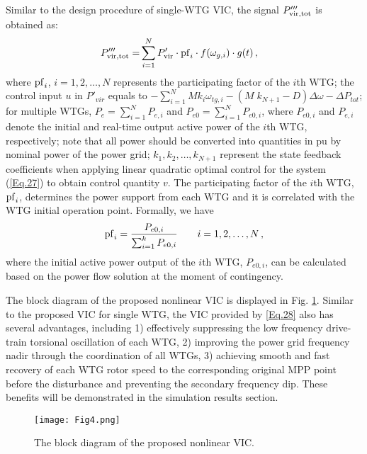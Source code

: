 \documentclass[journal]{IEEEtran}
\begin{document}
Similar to the design procedure of single-WTG VIC, the signal $P'''_{\rm vir, tot}$ is obtained as:
%
\begin{equation}
  \label{Eq.28}
  \begin{aligned}
    P'''_{\rm vir, tot} =& \sum_{i=1}^N P'_{{\rm vir}} \cdot {\rm pf}_i \cdot f(\omega_{g,i})\cdot g(t) \, ,
  \end{aligned} 
\end{equation}
where ${\rm pf}_i$, $i=1,2,\dots,N$ represents the participating factor of the $i$th WTG; the control input $u$ in $P'_{vir}$ equals to $-\sum_{i=1}^N {M{k_i}\omega_{tg,i}-(M\;k_{N+1}-D)\Delta \omega -\Delta P_{tot}}$; for multiple WTGs, $P_e=\sum_{i=1}^N P_{e,i}$ and $P_{e0}=\sum_{i=1}^N P_{{e0},i}$, where $P_{{e0},i}$ and $P_{e,i}$ denote the initial and real-time output active power of the $i$th WTG, respectively; note that all power should be converted into quantities in pu by nominal power of the power grid; $k_1,k_2, \dots,k_{N+1}$ represent the state feedback coefficients when applying linear quadratic optimal control for the system (\ref{Eq.27}) to obtain control quantity $v$. The participating factor of the $i$th WTG, ${\rm pf}_i$, determines the power support from each WTG and it is correlated with the WTG initial operation point. Formally, we have
%
\begin{equation}
  \label{Eq.29}
  {\rm pf}_i=\frac{P_{e0,i}}{\sum_{i=1}^k P_{e0,i}}
  \qquad i=1,2,\dots, N \, ,
\end{equation}
where the initial active power output of the $i$th WTG, $P_{e0,i}$, can be calculated based on the power flow solution at the moment of contingency. 

The block diagram of the proposed nonlinear VIC is displayed in Fig. \ref{Fig.4}. Similar to the proposed VIC for single WTG, the VIC provided by \eqref{Eq.28} also has several advantages, including 1) effectively suppressing the low frequency drive-train torsional oscillation of each WTG, 2) improving the power grid frequency nadir through the coordination of all WTGs, 3) achieving smooth and fast recovery of each WTG rotor speed to the corresponding original MPP point before the disturbance and preventing the secondary frequency dip. These benefits will be demonstrated in the simulation results section.

\begin{figure}
  \centering
  \texttt{[image: Fig4.png]}
  \caption{The block diagram of the proposed nonlinear VIC.}
  \label{Fig.4}
\end{figure}
\end{document}
